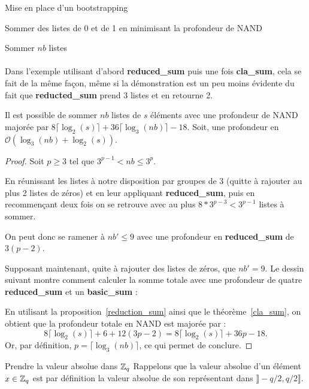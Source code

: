 \begin{section}{Mise en place d'un bootstrapping}
\begin{subsection}{Sommer des listes de 0 et de 1 en minimisant la profondeur de NAND}
\begin{subsubsection}{Sommer $nb$ listes}
\paragraph{}
Dans l'exemple utilisant d'abord \textbf{reduced\_sum} puis une fois \textbf{cla\_sum}, 
cela se fait de la même façon, même si la démonstration est un peu moins évidente du fait que
\textbf{reducted\_sum} prend 3 listes et en retourne 2.

\begin{prop}
\label{sum_list}
Il est possible de sommer $nb$ listes de $s$ éléments avec une profondeur de NAND majorée par 
$8 \lceil \log_2(s) \rceil + 36\lceil\log_3(nb)\rceil -18$. Soit, une profondeur en $\mathcal{O}(\log_3(nb) + \log_2(s))$.
\end{prop}

\begin{proof}
Soit $p \geqslant 3$ tel que $3^{p-1} < nb \leqslant 3^{p}$.

En réunissant les listes à notre disposition par groupes de 3 (quitte à rajouter au plus 2 listes de zéros) et en leur appliquant \textbf{reduced\_sum}, puis
en recommençant deux fois on se retrouve avec au plus \mbox{$8 * 3^{p-3} < 3^{p-1}$} listes à sommer.

On peut donc se ramener à $nb' \leqslant 9$ avec une profondeur en \textbf{reduced\_sum} de $3(p - 2)$.

Supposant maintenant, quite à rajouter des listes de zéros, que  $nb' = 9$. Le dessin suivant montre comment calculer
la somme totale avec une profondeur de quatre \textbf{reduced\_sum} et un \textbf{basic\_sum} :

\begin{center}

\end{center}

En utilisant la proposition~\ref{reduction_sum} ainsi que le théorème~\ref{cla_sum}, on obtient que la profondeur totale en NAND est majorée par :
\[ 8 \lceil \log_2(s)\rceil + 6+ 12(3p - 2) = 8 \lceil \log_2(s) \rceil + 36p -18.\]
Or, par définition, $p = \lceil \log_3(nb) \rceil$, ce qui permet de conclure.
\end{proof}

\end{subsubsection}
\end{subsection}
\begin{subsection}{Prendre la valeur absolue dans $\mathbb{Z}_q$}
	Rappelons que la valeur absolue d'un élément $x\in \mathbb{Z}_q$ est par définition la valeur absolue de son représentant dans $\rrbracket -q/2, q/2\rrbracket$. 
	

\end{subsection}
\end{section}

